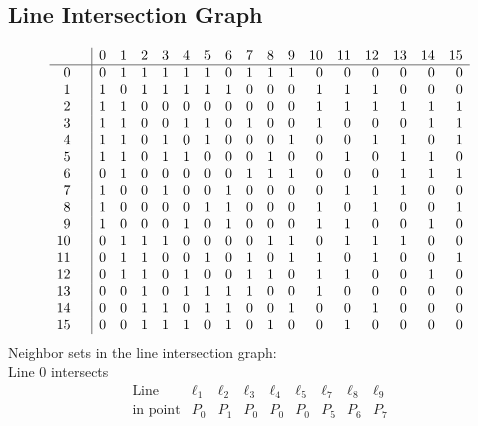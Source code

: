 \documentclass{article}
\begin{document}
{\subsection*{Line Intersection Graph}
{\arraycolsep=1pt
$$
\begin{array}{rr|*{16}r}
 &  & 0 & 1 & 2 & 3 & 4 & 5 & 6 & 7 & 8 & 9 & 10 & 11 & 12 & 13 & 14 & 15\\
\hline
0 &  & 0 & 1 & 1 & 1 & 1 & 1 & 0 & 1 & 1 & 1 & 0 & 0 & 0 & 0 & 0 & 0\\
1 &  & 1 & 0 & 1 & 1 & 1 & 1 & 1 & 0 & 0 & 0 & 1 & 1 & 1 & 0 & 0 & 0\\
2 &  & 1 & 1 & 0 & 0 & 0 & 0 & 0 & 0 & 0 & 0 & 1 & 1 & 1 & 1 & 1 & 1\\
3 &  & 1 & 1 & 0 & 0 & 1 & 1 & 0 & 1 & 0 & 0 & 1 & 0 & 0 & 0 & 1 & 1\\
4 &  & 1 & 1 & 0 & 1 & 0 & 1 & 0 & 0 & 0 & 1 & 0 & 0 & 1 & 1 & 0 & 1\\
5 &  & 1 & 1 & 0 & 1 & 1 & 0 & 0 & 0 & 1 & 0 & 0 & 1 & 0 & 1 & 1 & 0\\
6 &  & 0 & 1 & 0 & 0 & 0 & 0 & 0 & 1 & 1 & 1 & 0 & 0 & 0 & 1 & 1 & 1\\
7 &  & 1 & 0 & 0 & 1 & 0 & 0 & 1 & 0 & 0 & 0 & 0 & 1 & 1 & 1 & 0 & 0\\
8 &  & 1 & 0 & 0 & 0 & 0 & 1 & 1 & 0 & 0 & 0 & 1 & 0 & 1 & 0 & 0 & 1\\
9 &  & 1 & 0 & 0 & 0 & 1 & 0 & 1 & 0 & 0 & 0 & 1 & 1 & 0 & 0 & 1 & 0\\
10 &  & 0 & 1 & 1 & 1 & 0 & 0 & 0 & 0 & 1 & 1 & 0 & 1 & 1 & 1 & 0 & 0\\
11 &  & 0 & 1 & 1 & 0 & 0 & 1 & 0 & 1 & 0 & 1 & 1 & 0 & 1 & 0 & 0 & 1\\
12 &  & 0 & 1 & 1 & 0 & 1 & 0 & 0 & 1 & 1 & 0 & 1 & 1 & 0 & 0 & 1 & 0\\
13 &  & 0 & 0 & 1 & 0 & 1 & 1 & 1 & 1 & 0 & 0 & 1 & 0 & 0 & 0 & 0 & 0\\
14 &  & 0 & 0 & 1 & 1 & 0 & 1 & 1 & 0 & 0 & 1 & 0 & 0 & 1 & 0 & 0 & 0\\
15 &  & 0 & 0 & 1 & 1 & 1 & 0 & 1 & 0 & 1 & 0 & 0 & 1 & 0 & 0 & 0 & 0\\
\end{array}
$$
}%
Neighbor sets in the line intersection graph:\\
Line 0 intersects 
$$
\begin{array}{|r*{8}{|c}|}
\hline
\mbox{Line}  & \ell_{1} & \ell_{2} & \ell_{3} & \ell_{4} & \ell_{5} & \ell_{7} & \ell_{8} & \ell_{9}\\
\hline
\mbox{in point}  & P_{0} & P_{1} & P_{0} & P_{0} & P_{0} & P_{5} & P_{6} & P_{7}\\

\end{array}$$}
\end{document}
